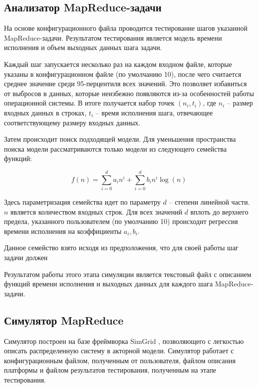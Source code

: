 \documentclass[../diploma.tex]{subfile}
\begin{document}
    \subsection{Анализатор MapReduce-задачи}

    На основе конфигурационного файла проводится тестирование шагов указанной 
    MapReduce\hyp{}задачи. Результатом тестирования является модель времени
    исполнения и объем выходных данных шага задачи.

    Каждый шаг запускается несколько раз на каждом входном файле, которые
    указаны в конфигурационном файле (по умолчанию 10), после чего считается
    среднее значение среди 95-перцентиля всех значений. Это позволяет избавиться
    от выбросов в данных, которые неизбежно появляются из-за особенностей работы
    операционной системы. В итоге получается набор точек $(n_i, t_i)$, где $n_i$
    -- размер входных данных в строках, $t_i$ -- время исполнения шага,
    отвечающее соответствующему размеру входных данных.
    
    Затем происходит поиск подходящей модели. Для уменьшения пространства поиска
    модели рассматриваются только модели из следующего семейства функций:
    
    \begin{equation} 
        f(n) = \sum_{i = 0}^d a_in^i + \sum_{i=0}^d b_in^i\log(n)
    \end{equation} 

    Здесь параметризация семейства идет по параметру $d$ -- степени линейной
    части. $n$ является количеством входных строк. Для всех значений $d$ вплоть
    до верхнего предела, указанного пользователем (по умолчанию 10) происходит
    регрессия времени исполнения на коэффициенты $a_i, b_i$. 
    
    Данное семейство взято исходя из предположения, что для своей работы шаг задачи должен 

    Результатом работы этого этапа симуляции является текстовый файл с описанием
    функций времени исполнения и выходных данных для каждого шага
    MapReduce-задачи.

    \subsection{Симулятор MapReduce}
    
    Симулятор построен на базе фреймворка SimGrid \cite{simgrid}, позволяющего с
    легкостью описать распределенную систему в акторной модели. Симулятор
    работает с конфигурационным файлом, полученным от пользователя, файлом
    описания платформы и файлом результатов тестирования, полученным на этапе
    тестирования. 
\end{document}
